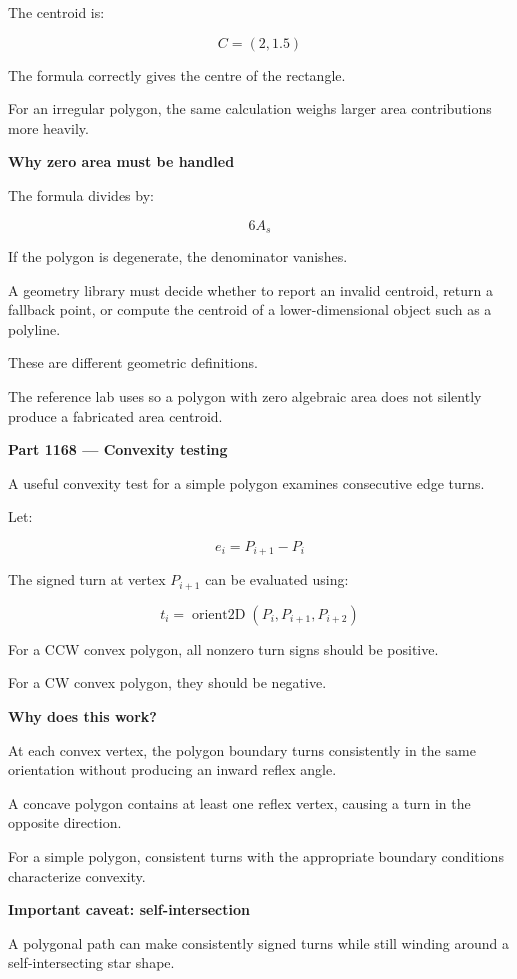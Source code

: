 The centroid is:

\[
\boxed{C=(2,1.5)}
\]

The formula correctly gives the centre of the rectangle.

For an irregular polygon, the same calculation weighs larger area contributions more heavily.

\textbf{Why zero area must be handled}

The formula divides by:

\[
6A_s
\]

If the polygon is degenerate, the denominator vanishes.

A geometry library must decide whether to report an invalid centroid, return a fallback point, or compute the centroid of a lower-dimensional object such as a polyline.

These are different geometric definitions.

The reference lab uses  so a polygon with zero algebraic area does not silently produce a fabricated area centroid.

\textbf{Part 1168 --- Convexity testing}

A useful convexity test for a simple polygon examines consecutive edge turns.

Let:

\[
e_i=P_{i+1}-P_i
\]

The signed turn at vertex \(P_{i+1}\) can be evaluated using:

\[
\boxed{ t_i=\operatorname{orient2D}(P_i,P_{i+1},P_{i+2}) }
\]

For a CCW convex polygon, all nonzero turn signs should be positive.

For a CW convex polygon, they should be negative.

\textbf{Why does this work?}

At each convex vertex, the polygon boundary turns consistently in the same orientation without producing an inward reflex angle.

A concave polygon contains at least one reflex vertex, causing a turn in the opposite direction.

For a simple polygon, consistent turns with the appropriate boundary conditions characterize convexity.

\textbf{Important caveat: self-intersection}

A polygonal path can make consistently signed turns while still winding around a self-intersecting star shape.

